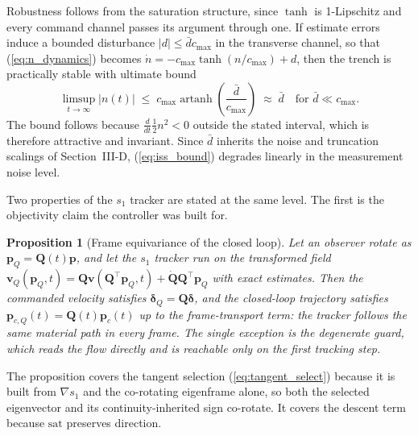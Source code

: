 \documentclass[lettersize,journal]{IEEEtran}
\newtheorem{proposition}{Proposition}
\begin{document}
Robustness follows from the saturation structure, since $\tanh$ is
1-Lipschitz and every command channel passes its argument through one.
If estimate errors induce a bounded disturbance $|d| \leq \bar{d} 
c_{\max}$ in the transverse channel, so that (\ref{eq:n_dynamics})
becomes $\dot{n} = -c_{\max}\tanh(n/c_{\max}) + d$, then the trench is
practically stable with ultimate bound
\begin{equation}
    \limsup_{t\to\infty} |n(t)| \;\leq\;
    c_{\max}\operatorname{artanh}\!\left(\frac{\bar{d}}{c_{\max}}\right)
    \;\approx\; \bar{d}
    \quad\text{for } \bar{d} \ll c_{\max}.
    \label{eq:iss_bound}
\end{equation}
The bound follows because $\tfrac{d}{dt}\tfrac{1}{2}n^2 < 0$ outside the
stated interval, which is therefore attractive and invariant. Since
$\bar{d}$ inherits the noise and truncation scalings of Section~\mbox{III-D},
(\ref{eq:iss_bound}) degrades linearly in
the measurement noise level.

Two properties of the $s_1$ tracker are stated at the same level. The
first is the objectivity claim the controller was built for.

\begin{proposition}[Frame equivariance of the closed loop]
\label{prop:equivariance}
Let an observer rotate as $\mathbf{p}_Q = \mathbf{Q}(t)\mathbf{p}$, and
let the $s_1$ tracker run on the
transformed field $\mathbf{v}_Q(\mathbf{p}_Q, t) =
\mathbf{Q}\mathbf{v}(\mathbf{Q}^\top\mathbf{p}_Q, t) +
\dot{\mathbf{Q}}\mathbf{Q}^\top\mathbf{p}_Q$ with exact estimates. Then
the commanded velocity satisfies $\boldsymbol{\delta}_Q =
\mathbf{Q}\boldsymbol{\delta}$, and the closed-loop trajectory satisfies
$\mathbf{p}_{c,Q}(t) = \mathbf{Q}(t)\mathbf{p}_c(t)$ up to the
frame-transport term: the tracker follows the same material path in
every frame. The single exception is the degenerate guard, which reads
the flow directly and is
reachable only on the first tracking step.
\end{proposition}

The proposition covers the tangent selection
(\ref{eq:tangent_select}) because it is built from $\nabla s_1$ and the
co-rotating eigenframe alone, so both the selected eigenvector and its
continuity-inherited sign co-rotate. It covers the descent term because
$\mathrm{sat}$ preserves direction.
\end{document}
